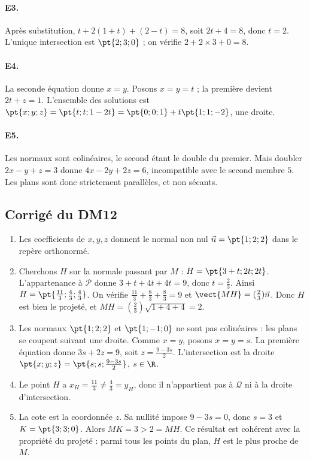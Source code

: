 \paragraph{E3.}Après substitution, $t+2(1+t)+(2-t)=8$, soit $2t+4=8$, donc $t=2$. L'unique intersection est $\pt{2;3;0}$ ; on vérifie $2+2\times3+0=8$.

\paragraph{E4.}La seconde équation donne $x=y$. Posons $x=y=t$ ; la première devient $2t+z=1$. L'ensemble des solutions est $\pt{x;y;z}=\pt{t;t;1-2t}=\pt{0;0;1}+t\pt{1;1;-2}$, une droite.

\paragraph{E5.}Les normaux sont colinéaires, le second étant le double du premier. Mais doubler $2x-y+z=3$ donne $4x-2y+2z=6$, incompatible avec le second membre $5$. Les plans sont donc strictement parallèles, et non sécants.


\subsection{Corrigé du DM12}\begin{enumerate}
\item Les coefficients de $x,y,z$ donnent le normal non nul $\vec n=\pt{1;2;2}$ dans le repère orthonormé.
\item Cherchons $H$ sur la normale passant par $M$ : $H=\pt{3+t;2t;2t}$. L'appartenance à $\mathcal P$ donne $3+t+4t+4t=9$, donc $t=\frac{2}{3}$. Ainsi $H=\pt{\frac{11}{3};\frac{4}{3};\frac{4}{3}}$. On vérifie $\frac{11}{3}+\frac{8}{3}+\frac{8}{3}=9$ et $\vect{MH}=(\frac{2}{3})\vec{n}$. Donc $H$ est bien le projeté, et $MH=(\frac{2}{3})\sqrt{1+4+4}=2$.
\item Les normaux $\pt{1;2;2}$ et $\pt{1;-1;0}$ ne sont pas colinéaires : les plans se coupent suivant une droite. Comme $x=y$, posons $x=y=s$. La première équation donne $3s+2z=9$, soit $z=\frac{9-3s}{2}$. L'intersection est la droite $\pt{x;y;z}=\pt{s;s;\frac{9-3s}{2}}$, $s\in\R$.
\item Le point $H$ a $x_H=\frac{11}{3}\ne\frac{4}{3}=y_H$, donc il n'appartient pas à $\mathcal Q$ ni à la droite d'intersection.
\item La cote est la coordonnée $z$. Sa nullité impose $9-3s=0$, donc $s=3$ et $K=\pt{3;3;0}$. Alors $MK=3>2=MH$. Ce résultat est cohérent avec la propriété du projeté : parmi tous les points du plan, $H$ est le plus proche de $M$.
\end{enumerate}

